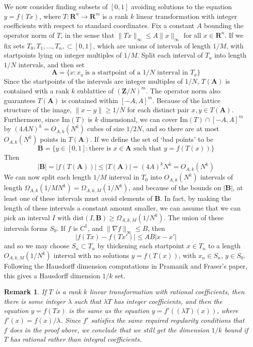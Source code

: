 \documentclass{report}
\theoremstyle{plain}
\theoremstyle{plain}
\newtheorem*{remark}{Remark}
\begin{document}
We now consider finding subsets of $[0,1]$ avoiding solutions to the equation $y = f(Tx)$, where $T: \mathbf{R}^n \to \mathbf{R}^m$ is a rank $k$ linear transformation with integer coefficients with respect to standard coordinates. Fix a constant $A$ bounding the operator norm of $T$, in the sense that $\| Tx \|_\infty \leq A \| x \|_\infty$ for all $x \in \mathbf{R}^n$. If we fix sets $T_0, T_1, \dots, T_n, \subset [0,1]$, which are unions of intervals of length $1/M$, with startpoints lying on integer multiples of $1/M$. Split each interval of $T_a$ into length $1/N$ intervals, and then set
%
\[ \mathbf{A} = \{ x : x_a\ \text{is a startpoint of a $1/N$ interval in $T_a$} \} \]
%
Since the startpoints of the intervals are integer multiples of $1/N$, $T(\mathbf{A})$ is contained with a rank $k$ sublattice of $(\mathbf{Z}/N)^m$. The operator norm also guarantees $T(\mathbf{A})$ is contained within $[-A,A]^m$. Because of the lattice structure of the image, $\| x - y \| \geq 1/N$ for each distinct pair $x,y \in T(\mathbf{A})$. Furthermore, since $\text{Im}(T)$ is $k$ dimensional, we can cover $\text{Im}(T) \cap [-A,A]^m$ by $(4AN)^k = O_{A,k}(N^k)$ cubes of size $1/2N$, and so there are at most $O_{A,k}(N^k)$ points in $T(\mathbf{A})$. If we define the set of `bad points' to be
%
\[ \mathbf{B} = \{ y \in [0,1] : \text{there is $x \in \mathbf{A}$ such that $y = f(T(x))$} \} \]
%
Then
%
\[ |\mathbf{B}| = |f(T(\mathbf{A}))| \leq |T(\mathbf{A})| = (4A)^k N^k = O_{A,k}(N^k) \]
We can now split each length $1/M$ interval in $T_0$ into $O_{A,k}(N^k)$ intervals of length $\Omega_{A,k}(1/MN^k) = \Omega_{A,k,M}(1/N^k)$, and because of the bounds on $|\mathbf{B}|$, at least one of these intervals must avoid elements of $\mathbf{B}$. In fact, by making the length of these intervals a constant amount smaller, we can assume that we can pick an interval $I$ with $\text{dist}(I,\mathbf{B}) \geq \Omega_{A,k,M}(1/N^k)$. The union of these intervals forms $S_0$. If $f$ is $C^1$, and $\| \nabla f \|_\infty \leq B$, then
%
\[ | f(Tx) - f(Tx')| \leq AB |x - x'| \]
%
and so we may choose $S_n \subset T_n$ by thickening each startpoint $x \in T_n$ to a length $O_{A,k,M}(1/N^k)$ interval with no solutions $y = f(T(x))$, with $x_n \in S_n$, $y \in S_0$. Following the Hausdorff dimension computations in Pramanik and Fraser's paper, this gives a Hausdorff dimension $1/k$ set.

\begin{remark}
    If $T$ is a rank $k$ linear transformation with rational coefficients, then there is some integer $\lambda$ such that $\lambda T$ has integer coefficients, and then the equation $y = f(Tx)$ is the same as the equation $y = f'((\lambda T)(x))$, where $f'(x) = f(x)/\lambda$. Since $f'$ satisfies the same required regularity conditions that $f$ does in the proof above, we conclude that we still get the dimension $1/k$ bound if $T$ has rational rather than integral coefficients.
\end{remark}
\end{document}
